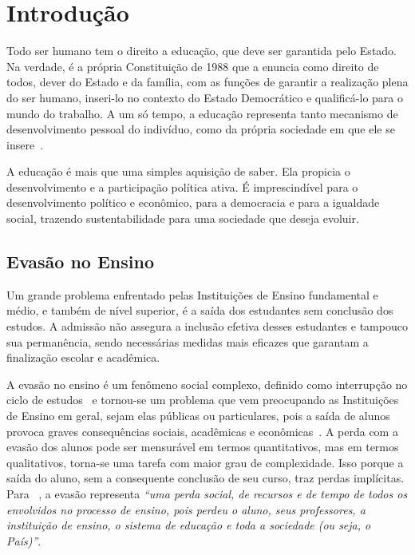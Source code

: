 \textual

\chapter{Introdução} \label{1title1}
	
Todo ser humano tem o direito a educação, que deve ser garantida pelo Estado. Na verdade, é a própria Constituição de 1988 \citep{constituicao} que a enuncia como direito de todos, dever do Estado e da família, com as funções de garantir a realização plena do ser humano, inseri-lo no contexto do Estado Democrático e qualificá-lo para o mundo do trabalho. A um só tempo, a educação representa tanto mecanismo de desenvolvimento pessoal do indivíduo, como da própria sociedade em que ele se insere~\citep{raposo2005}.

A educação é mais que uma simples aquisição de saber. Ela propicia o desenvolvimento e a participação política ativa. É imprescindível para o desenvolvimento político e econômico, para a democracia e para a igualdade social, trazendo sustentabilidade para uma sociedade que deseja evoluir.

\section{Evasão no Ensino}

Um grande problema enfrentado pelas Instituições de Ensino fundamental e médio, e também de nível superior, é a saída dos estudantes sem conclusão dos estudos. A admissão não assegura a inclusão efetiva desses estudantes e tampouco sua permanência, sendo necessárias medidas mais eficazes que garantam a finalização escolar e acadêmica.

A evasão no ensino é um fenômeno social complexo, definido como interrupção no ciclo de estudos~\citep{gaioso2005} e tornou-se um problema que vem preocupando as Instituições de Ensino em geral, sejam elas públicas ou particulares, pois a saída de alunos provoca graves consequências sociais, acadêmicas e econômicas~\citep{baggi_lopes2010}. A perda com a evasão dos alunos pode ser mensurável em termos quantitativos, mas em termos qualitativos, torna-se uma tarefa com maior grau de complexidade. Isso porque a saída do aluno, sem a consequente conclusão de seu curso, traz perdas implícitas. Para ~\citet[p. 1]{lobo2011}, a evasão representa \textit{“uma perda social, de recursos e de tempo de todos os envolvidos no processo de ensino, pois perdeu o aluno, seus professores, a instituição de ensino, o sistema de educação e toda a sociedade (ou seja, o País)”}.

